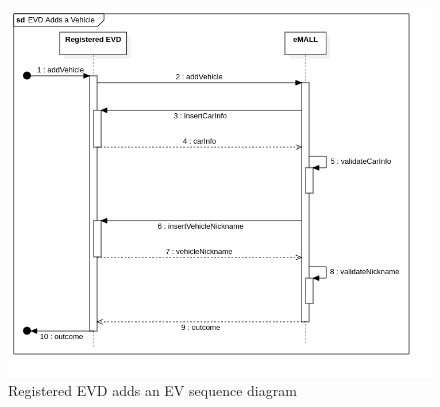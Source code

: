 \begin{center}
    \begin{figure} [H]
        \begin{center}
            \includegraphics[width=0.9\linewidth]{Images/SequenceDiagrams/evd_adds_a_vehicle}
            \caption{Registered EVD adds an EV sequence diagram}
            \label{fig: evd_adds_ev_seq_diag}
        \end{center}
    \end{figure}
\end{center}

